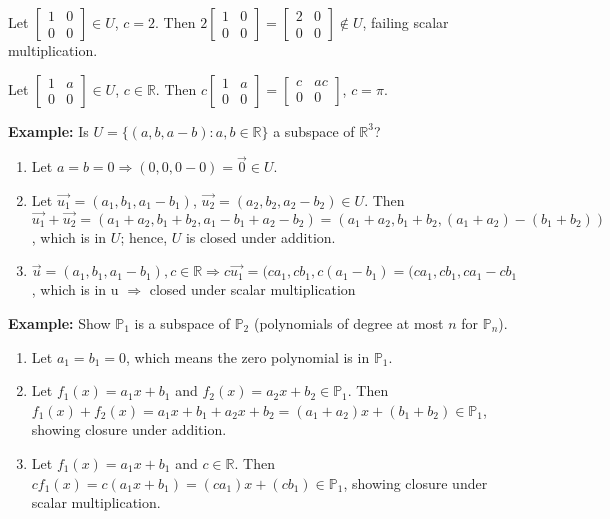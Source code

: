 \documentclass{article}
\begin{document}
Let $\begin{bmatrix} 1 & 0 \\ 0 & 0 \end{bmatrix} \in U$, $c = 2$. Then $2\begin{bmatrix} 1 & 0 \\ 0 & 0 \end{bmatrix} = \begin{bmatrix} 2 & 0 \\ 0 & 0 \end{bmatrix} \not\in U$, failing scalar multiplication.

Let $\begin{bmatrix} 1 & a \\ 0 & 0 \end{bmatrix} \in U$, $c \in \mathbb{R}$. Then $c\begin{bmatrix} 1 & a \\ 0 & 0 \end{bmatrix} = \begin{bmatrix} c & ac \\ 0 & 0 \end{bmatrix}$, $c=\pi$.

\textbf{Example:} Is $U = \{(a, b, a-b) : a, b \in \mathbb{R}\}$ a subspace of $\mathbb{R}^3$?

\begin{enumerate}
    \item Let $a=b=0 \Rightarrow (0,0,0-0) = \vec{0} \in U$.
    \item Let $\vec{u_1} = (a_1, b_1, a_1 - b_1)$, $\vec{u_2} = (a_2, b_2, a_2 - b_2) \in U$. Then $\vec{u_1} + \vec{u_2} = (a_1+a_2, b_1+b_2, a_1-b_1+a_2-b_2) = (a_1+a_2, b_1+b_2, (a_1+a_2)-(b_1+b_2))$, which is in $U$; hence, $U$ is closed under addition.
    \item $\vec{u} = (a_1, b_1, a_1-b_1), c \in \mathbb{R} \Rightarrow c\vec{u_1} = (ca_1, cb_1, c(a_1-b_1) = (ca_1, cb_1, ca_1-cb_1$, which is in u $\Rightarrow$ closed under scalar multiplication
\end{enumerate}

\textbf{Example:} Show $\mathbb{P}_1$ is a subspace of $\mathbb{P}_2$ (polynomials of degree at most $n$ for $\mathbb{P}_n$).

\begin{enumerate}
    \item Let $a_1 = b_1 = 0$, which means the zero polynomial is in $\mathbb{P}_1$.
    \item Let $f_1(x) = a_1x + b_1$ and $f_2(x) = a_2x + b_2 \in \mathbb{P}_1$. Then $f_1(x) + f_2(x) = a_1x + b_1 + a_2x + b_2 = (a_1 + a_2)x + (b_1 + b_2) \in \mathbb{P}_1$, showing closure under addition.
    \item Let $f_1(x) = a_1x + b_1$ and $c \in \mathbb{R}$. Then $cf_1(x) = c(a_1x + b_1) = (ca_1)x + (cb_1) \in \mathbb{P}_1$, showing closure under scalar multiplication.
\end{enumerate}
\end{document}
